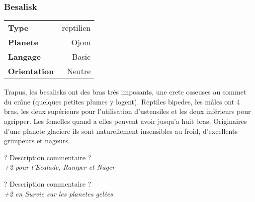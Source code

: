 \subsubsection{Besalisk}
	
\begin{flushright}	
    \begin{tabular}{|l|r|}
        \textbf{Type} & reptilien \\
        \textbf{Planete} & Ojom \\
        \textbf{Langage} & Basic \\
        \textbf{Orientation} & Neutre\\
    \end{tabular}
\end{flushright}

Trapus, les besalisks ont des bras très imposants, une crete osseuses au sommet du crâne (quelques petites plumes y logent). Reptiles bipedes, les mâles ont 4 bras, les deux supérieurs pour l’utilisation d’ustensiles et les deux inférieurs pour agripper. Les femelles quand a elles peuvent avoir jusqu’a huit bras. Originaires d’une planete glaciere ils sont naturellement insensibles au froid, d’excellents grimpeurs et nageurs. 

\begin{description}[align=left]
\item [A bras le corps]
    ? Description commentaire ?\\
    \emph{+2 pour l’Ecalade, Ramper et Nager} 

\item [Pas frilleux]
    ? Description commentaire ?\\
    \emph{+2 en Survie sur les planetes gelées}
\end{description}